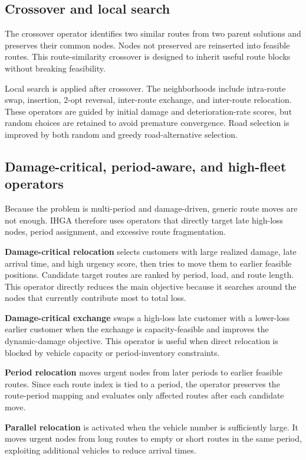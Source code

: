 ﻿\documentclass[preprint,12pt,authoryear]{elsarticle}
\begin{document}
\subsection{Crossover and local search}

The crossover operator identifies two similar routes from two parent solutions and preserves their common nodes. Nodes not preserved are reinserted into feasible routes. This route-similarity crossover is designed to inherit useful route blocks without breaking feasibility.

Local search is applied after crossover. The neighborhoods include intra-route swap, insertion, 2-opt reversal, inter-route exchange, and inter-route relocation. These operators are guided by initial damage and deterioration-rate scores, but random choices are retained to avoid premature convergence. Road selection is improved by both random and greedy road-alternative selection.

\subsection{Damage-critical, period-aware, and high-fleet operators}

Because the problem is multi-period and damage-driven, generic route moves are not enough. IHGA therefore uses operators that directly target late high-loss nodes, period assignment, and excessive route fragmentation.

\textbf{Damage-critical relocation} selects customers with large realized damage, late arrival time, and high urgency score, then tries to move them to earlier feasible positions. Candidate target routes are ranked by period, load, and route length. This operator directly reduces the main objective because it searches around the nodes that currently contribute most to total loss.

\textbf{Damage-critical exchange} swaps a high-loss late customer with a lower-loss earlier customer when the exchange is capacity-feasible and improves the dynamic-damage objective. This operator is useful when direct relocation is blocked by vehicle capacity or period-inventory constraints.

\textbf{Period relocation} moves urgent nodes from later periods to earlier feasible routes. Since each route index is tied to a period, the operator preserves the route-period mapping and evaluates only affected routes after each candidate move.

\textbf{Parallel relocation} is activated when the vehicle number is sufficiently large. It moves urgent nodes from long routes to empty or short routes in the same period, exploiting additional vehicles to reduce arrival times.
\end{document}
